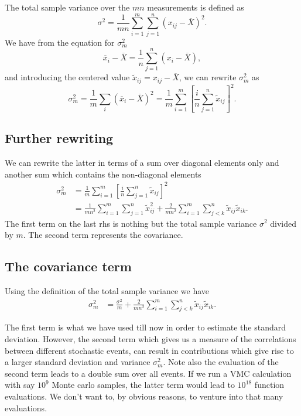 \documentclass[%
oneside,                 %
final,                   %
10pt]{article}
\begin{document}
The total sample variance over the $mn$ measurements is defined as
\[
\sigma^2=\frac{1}{mn}\sum_{i=1}^{m} \sum_{j=1}^{n}\left(x_{ij}-\overline{X}\right)^2.
\]
We have from the equation for $\sigma_m^2$ 
\[
\overline{x}_i-\overline{X}=\frac{1}{n}\sum_{j=1}^{n}\left(x_{i}-\overline{X}\right),
\]
and introducing the centered value $\tilde{x}_{ij}=x_{ij}-\overline{X}$, we can rewrite $\sigma_m^2$ as
\[
\sigma^2_{m}=\frac{1}{m}\sum_{i} \left( \overline{x}_{i}-\overline{X}\right)^2=\frac{1}{m}\sum_{i=1}^{m}\left[ \frac{i}{n}\sum_{j=1}^{n}\tilde{x}_{ij}\right]^2.
\]

\subsection{Further rewriting}

We can rewrite the latter in terms of a sum over diagonal elements only and another sum which contains the non-diagonal elements
\begin{align*}
\sigma^2_{m}& =\frac{1}{m}\sum_{i=1}^{m}\left[ \frac{i}{n}\sum_{j=1}^{n}\tilde{x}_{ij}\right]^2 \\
            & = \frac{1}{mn^2}\sum_{i=1}^{m} \sum_{j=1}^{n}\tilde{x}_{ij}^2+\frac{2}{mn^2}\sum_{i=1}^{m} \sum_{j<k}^{n}\tilde{x}_{ij}\tilde{x}_{ik}.
\end{align*}
The first term on the last rhs is nothing but the total sample variance $\sigma^2$ divided by $m$. The second term represents the covariance.

\subsection{The covariance term}

Using the definition of the total sample variance we have
\begin{align*}
\sigma^2_{m}& = \frac{\sigma^2}{m}+\frac{2}{mn^2}\sum_{i=1}^{m} \sum_{j<k}^{n}\tilde{x}_{ij}\tilde{x}_{ik}.
\end{align*}

The first term is what we have used till now in order to estimate the
standard deviation. However, the second term which gives us a measure
of the correlations between different stochastic events, can result in
contributions which give rise to a larger standard deviation and
variance $\sigma_m^2$. Note also the evaluation of the second term
leads to a double sum over all events. If we run a VMC calculation
with say $10^9$ Monte carlo samples, the latter term would lead to
$10^{18}$ function evaluations. We don't want to, by obvious reasons, to venture into that many evaluations.
\end{document}
